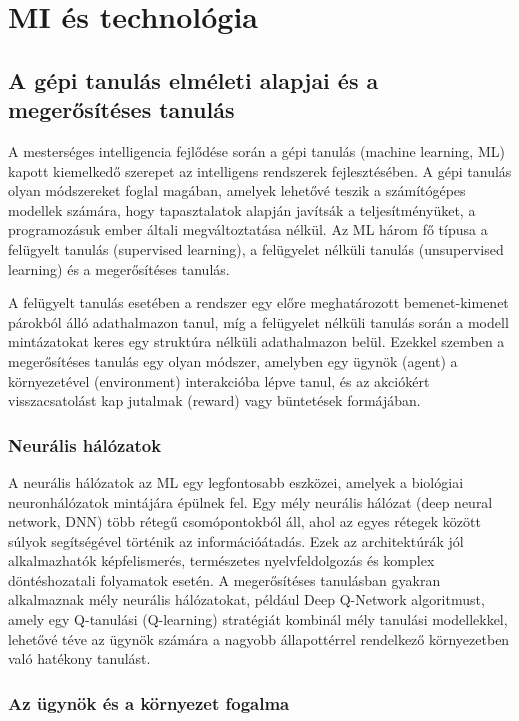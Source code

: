 \documentclass[
]{thesis-ekf}
\theoremstyle{definition}
\theoremstyle{remark}
\begin{document}
\chapter{MI és technológia}

\section{A gépi tanulás elméleti alapjai és a megerősítéses tanulás}

A mesterséges intelligencia fejlődése során a gépi tanulás (machine learning, ML) kapott kiemelkedő szerepet az intelligens rendszerek fejlesztésében. A gépi tanulás olyan módszereket foglal magában, amelyek lehetővé teszik a számítógépes modellek számára, hogy tapasztalatok alapján javítsák a teljesítményüket, a programozásuk ember általi megváltoztatása nélkül. Az ML három fő típusa a felügyelt tanulás (supervised learning), a felügyelet nélküli tanulás (unsupervised learning) és a megerősítéses tanulás. \cite{ML}

A felügyelt tanulás esetében a rendszer egy előre meghatározott bemenet-kimenet párokból álló adathalmazon tanul, míg a felügyelet nélküli tanulás során a modell mintázatokat keres egy struktúra nélküli adathalmazon belül. Ezekkel szemben a megerősítéses tanulás egy olyan módszer, amelyben egy ügynök (agent) a környezetével (environment) interakcióba lépve tanul, és az akciókért visszacsatolást kap jutalmak (reward) vagy büntetések formájában.

\subsection{Neurális hálózatok}

A neurális hálózatok az ML egy legfontosabb eszközei, amelyek a biológiai neuronhálózatok mintájára épülnek fel. Egy mély neurális hálózat (deep neural network, DNN) több rétegű csomópontokból áll, ahol az egyes rétegek között súlyok segítségével történik az információátadás. Ezek az architektúrák jól alkalmazhatók képfelismerés, természetes nyelvfeldolgozás és komplex döntéshozatali folyamatok esetén. A megerősítéses tanulásban gyakran alkalmaznak mély neurális hálózatokat, például Deep Q-Network algoritmust, amely egy Q-tanulási (Q-learning) stratégiát kombinál mély tanulási modellekkel, lehetővé téve az ügynök számára a nagyobb állapottérrel rendelkező környezetben való hatékony tanulást. \cite{NN}

\subsection{Az ügynök és a környezet fogalma}
\end{document}
